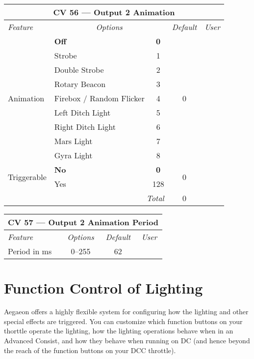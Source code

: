 \documentclass[12pt,letterpaper,draft]{memoir} %
\begin{document}
\label{CV56}
\begin{center}
\begin{tabular}{|l|lc|c|c|}
\hline
\multicolumn{5}{|c|}{\textbf{CV 56 --- Output 2 Animation}} \\ \hline \hline
\textit{Feature} & \multicolumn{2}{c|}{\textit{Options}} & \textit{Default} & \textit{User} \\ \hline
\multirow{9}{*}{Animation}		& \textbf{Off}		& \textbf{0} 		& \multirow{9}{*}{0} 	&\\
			& Strobe 			& 1 		& 				& \\ 
			& Double Strobe	& 2 		& 				& \\ 
			& Rotary Beacon 	& 3 		& 				& \\ 
			& Firebox / Random Flicker 			& 4 		& 				& \\ 
			& Left Ditch Light 	& 5 		& 				& \\ 
			& Right Ditch Light 	& 6 		& 				& \\
			& Mars Light 		& 7 		& 				& \\
			& Gyra Light 		& 8 		& 				& \\ \hline
\multirow{2}{*}{Triggerable}	& \textbf{No}		& \textbf{0} 		& \multirow{2}{*}{0} 	&\\
			& Yes	 		& 128	& 				& \\ \hline\hline
\multicolumn{3}{|r|}{\textit{Total}} & 0 &\\ \hline
\end{tabular}
\end{center}

\label{CV57}
\begin{center}
\begin{tabular}{|l|c|c|c|}
\hline
\multicolumn{4}{|c|}{\textbf{CV 57 --- Output 2 Animation Period}} \\ \hline \hline
\textit{Feature} & \textit{Options} & \textit{Default} & \textit{User} \\ \hline
Period in ms & 0--255 & 62 &\\ \hline
\end{tabular}
\end{center}


\section{Function Control of Lighting}

Aegaeon offers a highly flexible system for configuring how the lighting and other special effects are triggered. You can customize which function buttons on your thorttle operate the lighting, how the lighting operations behave when in an Advanced Consist, and how they behave when running on DC (and hence beyond the reach of the function buttons on your DCC throttle).
\end{document}
